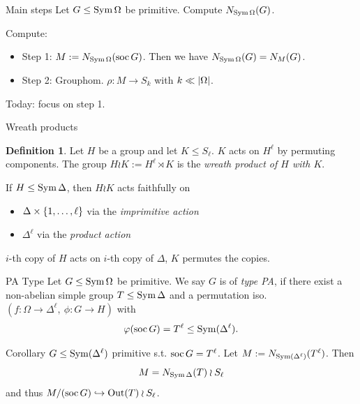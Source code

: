 \documentclass{beamer}
\theoremstyle{plain}
\theoremstyle{definition}
\newtheorem{defn}[thm]{Definition}
\begin{document}

\begin{frame}{Main steps}
Let $G \leq \operatorname{Sym} \Omega$ be primitive.
Compute $N_{\operatorname{Sym} \Omega}(G)$.

Compute:
\begin{itemize}
\item Step 1: $M := N_{\operatorname{Sym} \Omega}(\operatorname{soc} G)$.
Then we have $N_{\operatorname{Sym} \Omega}(G) = N_M(G)$.

\item Step 2: Grouphom.
$
    \rho : M \to S_k
$
with $k \ll  \left| \Omega \right| $.
\end{itemize}
\vspace{1em}

\pause
Today: focus on step 1.
\end{frame}

\begin{frame}{Wreath products}
\begin{defn}
    Let $H$ be a group and let $K \leq S_\ell$.
    $K$ acts on $H ^ \ell$ by permuting components.
    The group
    $H \wr K := H ^ \ell \rtimes K$
    is the \emph{wreath product of $H$ with $K$}.
\end{defn}

\pause
If $H \leq \operatorname{Sym} \Delta$, then $H \wr K$ acts faithfully on
\begin{itemize}
\item $\Delta \times  \left\{ 1, \ldots, \ell \right\} $ via the \emph{imprimitive action}
\item $\Delta ^ \ell$ via the \emph{product action}
\end{itemize}

$i$-th copy of $H$ acts on $i$-th copy of $\Delta$, $K$ permutes the copies.
\end{frame}


%

\begin{frame}{PA Type}
Let $G \leq \operatorname{Sym} \Omega$ be primitive.
We say $G$ is of \emph{type PA}, if
there exist a non-abelian simple group
$T \leq \operatorname{Sym} \Delta$
and a permutation iso.
$(f : \Omega \to \Delta ^ \ell,~ \phi : G \to H)$
with
\[
\varphi (\operatorname{soc} G) = T ^ \ell \leq \operatorname{Sym}(\Delta ^ \ell).
\]

\pause
\begin{block}{Corollary}
$G \leq \operatorname{Sym}(\Delta ^ \ell)$ primitive s.t.
$\operatorname{soc} G = T ^ \ell$.
Let $M := N_{\operatorname{Sym} (\Delta ^ \ell)}(T ^ \ell)$.
Then
\[
    M = N_{\operatorname{Sym} \Delta}(T) \wr S_\ell
\]
and thus $M / (\operatorname{soc} G) \hookrightarrow \operatorname{Out}(T) \wr S_\ell$.
\end{block}
\end{frame}
\end{document}

